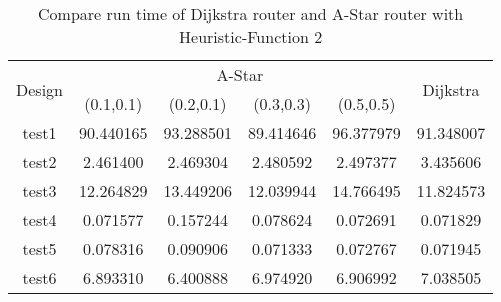 \documentclass[conference]{IEEEtran}
\begin{document}
\begin{table}
\caption{\label{tab:Compare-run-time-1}Compare run time of Dijkstra router
and A-Star router with Heuristic-Function 2}

\centering{}{\footnotesize{}}%
\begin{adjustbox}{width=\columnwidth,center}
\begin{tabular}{|c|c|c|c|c|c|}
\hline 
\multirow{2}{*}{{\footnotesize{}Design}} & \multicolumn{4}{c|}{{\footnotesize{}A-Star}} & \multirow{2}{*}{{\footnotesize{}Dijkstra}}\tabularnewline
\cline{2-5} \cline{3-5} \cline{4-5} \cline{5-5} 
 & {\footnotesize{}(0.1,0.1)} & {\footnotesize{}(0.2,0.1)} & {\footnotesize{}(0.3,0.3)} & {\footnotesize{}(0.5,0.5)} & \tabularnewline
\hline 
\hline 
{\footnotesize{}test1} & {\footnotesize{}90.440165} & {\footnotesize{}93.288501} & {\footnotesize{}89.414646} & {\footnotesize{}96.377979} & {\footnotesize{}91.348007}\tabularnewline
\hline 
{\footnotesize{}test2} & {\footnotesize{}2.461400} & {\footnotesize{}2.469304} & {\footnotesize{}2.480592} & {\footnotesize{}2.497377} & {\footnotesize{}3.435606}\tabularnewline
\hline 
{\footnotesize{}test3} & {\footnotesize{}12.264829} & {\footnotesize{}13.449206} & {\footnotesize{}12.039944} & {\footnotesize{}14.766495} & {\footnotesize{}11.824573}\tabularnewline
\hline 
{\footnotesize{}test4} & {\footnotesize{}0.071577} & {\footnotesize{}0.157244} & {\footnotesize{}0.078624} & {\footnotesize{}0.072691} & {\footnotesize{}0.071829}\tabularnewline
\hline 
{\footnotesize{}test5} & {\footnotesize{}0.078316} & {\footnotesize{}0.090906} & {\footnotesize{}0.071333} & {\footnotesize{}0.072767} & {\footnotesize{}0.071945}\tabularnewline
\hline 
{\footnotesize{}test6} & {\footnotesize{}6.893310} & {\footnotesize{}6.400888} & {\footnotesize{}6.974920} & {\footnotesize{}6.906992} & {\footnotesize{}7.038505}\tabularnewline
\hline 
\end{tabular}{\footnotesize\par}
\end{adjustbox}
\end{table}
\end{document}
